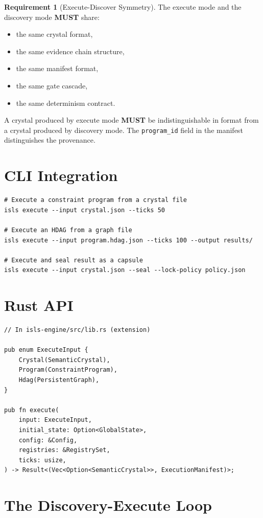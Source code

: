 \documentclass[11pt,a4paper,twoside]{article}
\theoremstyle{definition}
\newtheorem{requirement}{Requirement}[section]
\theoremstyle{plain}
\theoremstyle{remark}
\begin{document}
\begin{requirement}[Execute-Discover Symmetry]\label{req:symmetry}
The execute mode and the discovery mode \textbf{MUST} share:
\begin{itemize}[nosep]
  \item the same crystal format,
  \item the same evidence chain structure,
  \item the same manifest format,
  \item the same gate cascade,
  \item the same determinism contract.
\end{itemize}
A crystal produced by execute mode \textbf{MUST} be indistinguishable
in format from a crystal produced by discovery mode. The
\texttt{program\_id} field in the manifest distinguishes the provenance.
\end{requirement}

\section{CLI Integration}\label{sec:exec:cli}

\begin{verbatim}
# Execute a constraint program from a crystal file
isls execute --input crystal.json --ticks 50

# Execute an HDAG from a graph file
isls execute --input program.hdag.json --ticks 100 --output results/

# Execute and seal result as a capsule
isls execute --input crystal.json --seal --lock-policy policy.json
\end{verbatim}

\section{Rust API}\label{sec:exec:api}

\begin{verbatim}
// In isls-engine/src/lib.rs (extension)

pub enum ExecuteInput {
    Crystal(SemanticCrystal),
    Program(ConstraintProgram),
    Hdag(PersistentGraph),
}

pub fn execute(
    input: ExecuteInput,
    initial_state: Option<GlobalState>,
    config: &Config,
    registries: &RegistrySet,
    ticks: usize,
) -> Result<(Vec<Option<SemanticCrystal>>, ExecutionManifest)>;
\end{verbatim}

\section{The Discovery-Execute Loop}\label{sec:exec:loop}
\end{document}

